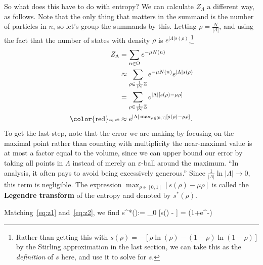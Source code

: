 So what does this have to do with entropy? We can calculate $Z_\Lambda$ a different way, as follows.
Note that the only thing that matters in the summand is the number of particles in $n$, so let's group the summands by this. Letting $\rho=\frac{N}{|\Lambda|}$, and using the fact that the number of states with density $\rho$ is $e^{|\Lambda|s(\rho)}$,\footnote{Rather than getting this with $s(\rho)=-[\rho\ln(\rho) - (1-\rho) \ln (1-\rho)]$ by the Stirling approximation in the last section, we can take this as the \emph{definition} of $s$ here, and use it to solve for $s$.}
\begin{align}
\nonumber
Z_\Lambda&=\sum_{n\in \Omega} e^{-\mu N(n)}\\
\nonumber
& \approx \sum_{\rho \in \frac{1}{|\Lambda|}\mathbb{Z}} e^{-\mu N(n)} e^{|\Lambda|s(\rho)}\\
\nonumber
& =\sum_{\rho \in \frac{1}{|\Lambda|}\mathbb{Z}} e^{|\Lambda|[s(\rho)-\mu \rho]}\\
\label{eq:z2}\text{{\color{red}\tiny eq:z2}}
&\approx e^{|\Lambda|\max_{\rho\in [0,1]}[s(\rho)-\mu\rho]}.
\end{align}
To get the last step, note that the error we are making by focusing on the maximal point rather than counting with multiplicity the near-maximal value is at most a factor equal to the volume, since we can upper bound our error by taking all points in $\Lambda$ instead of merely an $\varepsilon$-ball around the maximum. ``In analysis, it often pays to avoid being excessively generous.'' Since $\frac{1}{|\Lambda|}\ln |\Lambda|\to 0$, this term is negligible. %
The expression $\max_{\rho\in [0,1]}[s(\rho)-\mu\rho]$ is called the \textbf{Legendre transform} of the entropy and denoted by $s^*(\rho)$. 

Matching~\eqref{eq:z1} and~\eqref{eq:z2}, we find
\be
s^*(\mu):= \max_{0\le \rho{}} [s(\rho) - \mu\rho] = \ln (1+e^{-\mu})
\ee

